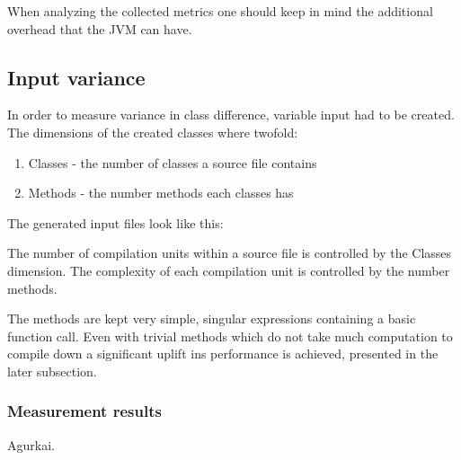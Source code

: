\documentclass{VUMIFPSbakalaurinis}
\begin{document}
When analyzing the collected metrics one should keep in mind the additional overhead that the JVM can have.

\subsection{Input variance}
In order to measure variance in class difference, variable input had to be created.
The dimensions of the created classes where twofold:

\begin{enumerate}
\item{Classes - the number of classes a source file contains}
\item{Methods - the number methods each classes has}
\end{enumerate}

The generated input files look like this:



The number of compilation units within a source file is controlled by the Classes dimension. The complexity of each compilation unit is controlled by the number methods.

The methods are kept very simple, singular expressions containing a basic function call.
Even with trivial methods which do not take much computation to compile down a significant uplift ins performance is achieved, presented in the later subsection.

\subsubsection{Measurement results}

Agurkai.


\begin{figure}
\end{figure}
\end{document}
